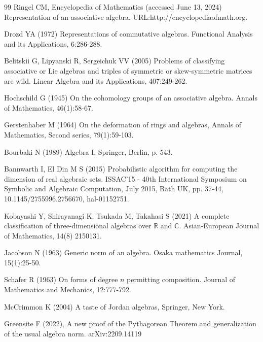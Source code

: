 \documentclass{amsart}
\numberwithin{equation}{section}
\theoremstyle{definition}
\numberwithin{theorem}{section}
\begin{document}
   \begin{thebibliography}{99}
 Ringel CM, Encyclopedia of Mathematics (accessed June 13, 2024) Representation of an associative algebra. URL:http://encyclopediaofmath.org.
   
     Drozd YA (1972) Representations of commutative algebras. Functional Analysis and its Applications, 6:286-288.
          
        Belitskii G, Lipyanski R, Sergeichuk VV (2005) Problems of classifying associative or Lie algebras and triples of symmetric or skew-symmetric matrices are wild.  Linear Algebra and its Applications, 407:249-262.
       
        Hochschild G (1945) On the cohomology groups of an associative algebra.  Annals of Mathematics, 46(1):58-67.
       
             Gerstenhaber M (1964) On the deformation of rings and algebras, Annals of Mathematics, Second series, 79(1):59-103.
       
               Bourbaki N (1989) Algebra I, Springer, Berlin, p. 543.

               
        Bannwarth I, El Din M S (2015) Probabilistic algorithm for computing the dimension of real algebraic sets.  ISSAC'15 - 40th International Symposium on Symbolic and Algebraic Computation, July 2015, Bath UK, pp. 37-44, 10.1145/2755996.2756670, hal-01152751.
       
               Kobayashi Y, Shirayanagi K, Tsukada M, Takahasi S (2021) A complete classification of three-dimensional algebras over $\mathbb{R}$ and $\mathbb{C}$. Asian-European Journal of Mathematics, 14(8) 2150131.                                        
   
               Jacobson N  (1963) Generic norm of an algebra. Osaka mathematics Journal, 15(1):25-50.
  
          Schafer R (1963) On forms of degree $n$ permitting composition. Journal of Mathematics and Mechanics, 12:777-792. 
         
      
        McCrimmon K (2004) A taste of Jordan algebras, Springer, New York.
       

               Greensite F (2022), A new proof of the Pythagorean Theorem and generalization of the usual algebra norm. arXiv:2209.14119
              

\end{thebibliography}
\end{document}
